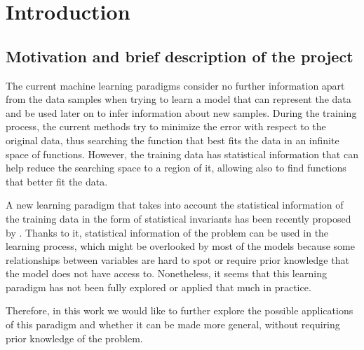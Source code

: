 
\chapter{Introduction}

\label{Chapter1}


\section{Motivation and brief description of the project}

The current machine learning paradigms consider no further information apart from the data
samples when trying to learn a model that can represent the data and be used later on
to infer information about new samples. During the training process, the current methods
try to minimize the error with respect to the original data, thus searching the function
that best fits the data in an infinite space of functions. However, the training data has
statistical information that can help reduce the searching space to a region of it, allowing
also to find functions that better fit the data.

A new learning paradigm that takes into account the statistical information of the training data
in the form of statistical invariants has been recently proposed by \cite{Vapnik2019}. Thanks to it,
statistical information of the problem can be used in the learning process, which might
be overlooked by most of the models because some relationships between variables are hard to
spot or require prior knowledge that the model does not have access to. Nonetheless,
it seems that this learning paradigm has not been fully explored or applied that much in practice.

Therefore, in this work we would like to further explore the possible applications of this
paradigm and whether it can be made more general, without requiring prior knowledge of the problem.


